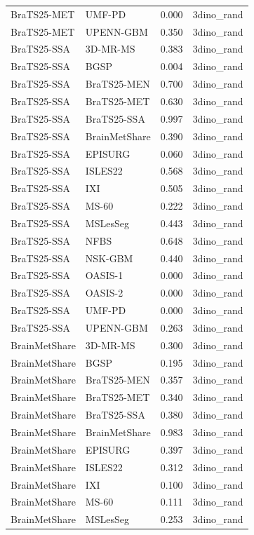 \begin{tabular}{llrl}
BraTS25-MET & UMF-PD & 0.000 & 3dino\_rand \\
BraTS25-MET & UPENN-GBM & 0.350 & 3dino\_rand \\
BraTS25-SSA & 3D-MR-MS & 0.383 & 3dino\_rand \\
BraTS25-SSA & BGSP & 0.004 & 3dino\_rand \\
BraTS25-SSA & BraTS25-MEN & 0.700 & 3dino\_rand \\
BraTS25-SSA & BraTS25-MET & 0.630 & 3dino\_rand \\
BraTS25-SSA & BraTS25-SSA & 0.997 & 3dino\_rand \\
BraTS25-SSA & BrainMetShare & 0.390 & 3dino\_rand \\
BraTS25-SSA & EPISURG & 0.060 & 3dino\_rand \\
BraTS25-SSA & ISLES22 & 0.568 & 3dino\_rand \\
BraTS25-SSA & IXI & 0.505 & 3dino\_rand \\
BraTS25-SSA & MS-60 & 0.222 & 3dino\_rand \\
BraTS25-SSA & MSLesSeg & 0.443 & 3dino\_rand \\
BraTS25-SSA & NFBS & 0.648 & 3dino\_rand \\
BraTS25-SSA & NSK-GBM & 0.440 & 3dino\_rand \\
BraTS25-SSA & OASIS-1 & 0.000 & 3dino\_rand \\
BraTS25-SSA & OASIS-2 & 0.000 & 3dino\_rand \\
BraTS25-SSA & UMF-PD & 0.000 & 3dino\_rand \\
BraTS25-SSA & UPENN-GBM & 0.263 & 3dino\_rand \\
BrainMetShare & 3D-MR-MS & 0.300 & 3dino\_rand \\
BrainMetShare & BGSP & 0.195 & 3dino\_rand \\
BrainMetShare & BraTS25-MEN & 0.357 & 3dino\_rand \\
BrainMetShare & BraTS25-MET & 0.340 & 3dino\_rand \\
BrainMetShare & BraTS25-SSA & 0.380 & 3dino\_rand \\
BrainMetShare & BrainMetShare & 0.983 & 3dino\_rand \\
BrainMetShare & EPISURG & 0.397 & 3dino\_rand \\
BrainMetShare & ISLES22 & 0.312 & 3dino\_rand \\
BrainMetShare & IXI & 0.100 & 3dino\_rand \\
BrainMetShare & MS-60 & 0.111 & 3dino\_rand \\
BrainMetShare & MSLesSeg & 0.253 & 3dino\_rand \\

\end{tabular}
